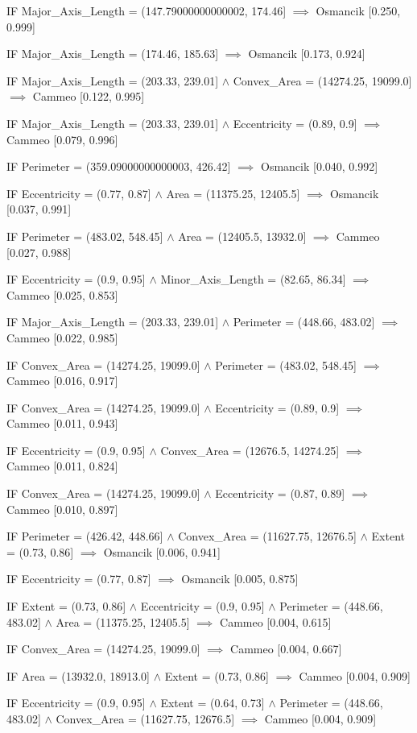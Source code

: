 IF Major_Axis_Length = (147.79000000000002, 174.46] $\implies$ Osmancik [0.250, 0.999]

IF Major_Axis_Length = (174.46, 185.63] $\implies$ Osmancik [0.173, 0.924]

IF Major_Axis_Length = (203.33, 239.01] $\land$ Convex_Area = (14274.25, 19099.0] $\implies$ Cammeo [0.122, 0.995]

IF Major_Axis_Length = (203.33, 239.01] $\land$ Eccentricity = (0.89, 0.9] $\implies$ Cammeo [0.079, 0.996]

IF Perimeter = (359.09000000000003, 426.42] $\implies$ Osmancik [0.040, 0.992]

IF Eccentricity = (0.77, 0.87] $\land$ Area = (11375.25, 12405.5] $\implies$ Osmancik [0.037, 0.991]

IF Perimeter = (483.02, 548.45] $\land$ Area = (12405.5, 13932.0] $\implies$ Cammeo [0.027, 0.988]

IF Eccentricity = (0.9, 0.95] $\land$ Minor_Axis_Length = (82.65, 86.34] $\implies$ Cammeo [0.025, 0.853]

IF Major_Axis_Length = (203.33, 239.01] $\land$ Perimeter = (448.66, 483.02] $\implies$ Cammeo [0.022, 0.985]

IF Convex_Area = (14274.25, 19099.0] $\land$ Perimeter = (483.02, 548.45] $\implies$ Cammeo [0.016, 0.917]

IF Convex_Area = (14274.25, 19099.0] $\land$ Eccentricity = (0.89, 0.9] $\implies$ Cammeo [0.011, 0.943]

IF Eccentricity = (0.9, 0.95] $\land$ Convex_Area = (12676.5, 14274.25] $\implies$ Cammeo [0.011, 0.824]

IF Convex_Area = (14274.25, 19099.0] $\land$ Eccentricity = (0.87, 0.89] $\implies$ Cammeo [0.010, 0.897]

IF Perimeter = (426.42, 448.66] $\land$ Convex_Area = (11627.75, 12676.5] $\land$ Extent = (0.73, 0.86] $\implies$ Osmancik [0.006, 0.941]

IF Eccentricity = (0.77, 0.87] $\implies$ Osmancik [0.005, 0.875]

IF Extent = (0.73, 0.86] $\land$ Eccentricity = (0.9, 0.95] $\land$ Perimeter = (448.66, 483.02] $\land$ Area = (11375.25, 12405.5] $\implies$ Cammeo [0.004, 0.615]

IF Convex_Area = (14274.25, 19099.0] $\implies$ Cammeo [0.004, 0.667]

IF Area = (13932.0, 18913.0] $\land$ Extent = (0.73, 0.86] $\implies$ Cammeo [0.004, 0.909]

IF Eccentricity = (0.9, 0.95] $\land$ Extent = (0.64, 0.73] $\land$ Perimeter = (448.66, 483.02] $\land$ Convex_Area = (11627.75, 12676.5] $\implies$ Cammeo [0.004, 0.909]

